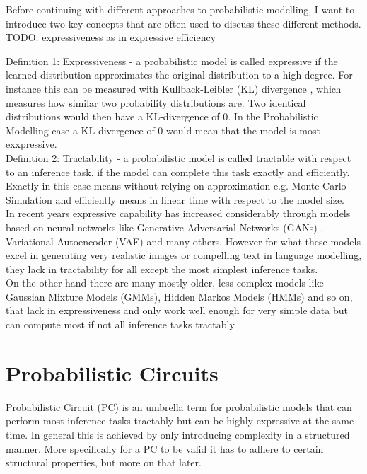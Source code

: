 Before continuing with different approaches to probabilistic modelling, I want to introduce two key concepts that are often 
used to discuss these different methods. \\

TODO: expressiveness as in expressive efficiency

Definition 1: Expressiveness - a probabilistic model is called expressive if the learned distribution approximates the original distribution to a high degree.
For instance this can be measured with Kullback-Leibler (KL) divergence \cite{kl_divergence}, which measures how similar two probability distributions are. 
Two identical distributions would then have a KL-divergence of $0$. In the Probabilistic Modelling case a KL-divergence of 0 would mean that the model is most exxpressive. \\

Definition 2: Tractability - a probabilistic model is called tractable with respect to an inference task, if the model can complete this 
task exactly and efficiently. Exactly in this case means without relying on approximation e.g. Monte-Carlo Simulation and efficiently 
means in linear time with respect to the model size. \\

In recent years expressive capability has increased considerably through models based on neural networks like Generative-Adversarial
Networks (GANs) \cite{gan}, Variational Autoencoder (VAE) \cite{vae} and many others. However for what these models excel in generating 
very realistic images or compelling text in language modelling, they lack in tractability for all except the most simplest inference tasks. 
\cite{pc_intro} \\

On the other hand there are many mostly older, less complex models like Gaussian Mixture Models (GMMs), Hidden Markos Models (HMMs) and so on, 
that lack in expressiveness and only work well enough for very simple data but can compute most if not all inference tasks tractably.

\section{Probabilistic Circuits}
\label{sec:pc}

Probabilistic Circuit (PC) is an umbrella term for probabilistic models that can perform most inference tasks tractably but can be 
highly expressive at the same time. In general this is achieved by only introducing complexity in a structured manner. More specifically
for a PC to be valid it has to adhere to certain structural properties, but more on that later. \\

